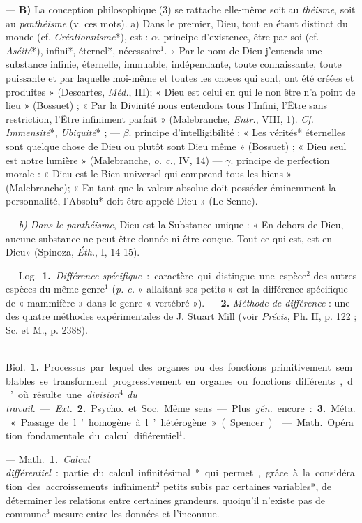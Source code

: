 \begin{itemize}[leftmargin=1cm, label=, itemsep=1pt]
— {\bf B)} La conception philosophique (3) se rattache elle-même
soit au {\it théisme}, soit au {\it panthéisme}
(v. ces mots). a) Dans le premier,
Dieu, tout en étant distinct du
monde (cf. {\it Créationnisme}*), est :
$\alpha$. principe d'existence, être par soi
(cf. {\it Aséité}*), infini*, éternel*, nécessaire$^1$. « Par le nom de Dieu j’entends une substance infinie, éternelle, immuable, indépendante,
toute connaissante, toute puissante
et par laquelle moi-même et toutes
les choses qui sont, ont été créées et
produites » (Descartes, {\it Méd.}, III);
« Dieu est celui en qui le non être
n’a point de lieu » (Bossuet) ; « Par
la Divinité nous entendons tous
l'Infini, l’Être sans restriction, l'Être
infiniment parfait » (Malebranche,
{\it Entr.}, VIII, 1). {\it Cf.} {\it Immensité}*,
{\it Ubiquité}* ; — $\beta$. principe d'intelligibilité : « Les vérités* éternelles
sont quelque chose de Dieu ou
plutôt sont Dieu même » (Bossuet) ;
« Dieu seul est notre lumière » (Malebranche, {\it o. c.}, IV, 14) — $\gamma$. principe
de perfection morale : « Dieu est le
Bien universel qui comprend tous
les biens » (Malebranche); « En tant
que la valeur absolue doit posséder
éminemment la personnalité, l’Absolu*
doit être appelé Dieu » (Le
Senne).

— {\it b) Dans le panthéisme}, Dieu
est la Substance unique : « En dehors
de Dieu, aucune substance ne peut
être donnée ni être conçue. Tout ce
qui est, est en Dieu» (Spinoza, {\it Éth.},
I, 14-15).

 — \si{Log.} {\bf 1.} {\it Différence spécifique} : caractère qui distingue une
espèce$^2$ des autres espèces du même
genre$^1$ ({\it p. e.} « allaitant ses petits » est
la différence spécifique de « mammifère » dans le genre « vertébré »).
— {\bf 2.} {\it Méthode de différence} : une
des quatre méthodes expérimentales
de J. Stuart Mill (voir  {\it Précis}, Ph. II,
p. 122 ; Sc. et M., p. 2388).

 — \si{Biol.} {\bf 1.} Processus par lequel des organes ou des
fonctions primitivement semblables
se transforment progressivement en
organes ou fonctions différents, d’où
résulte une {\it division$^4$ du travail.} —
{\it Ext.} {\bf 2.} \si{Psycho.} et \si{Soc.} Même sens.
— Plus  {\it gén.} encore : {\bf 3.} \si{Méta.} « Passage de l’homogène à l’hétérogène »
(Spencer).

 — \si{Math.} Opération
fondamentale du calcul difiérentiel$^1$.

 — \si{Math.} {\bf 1.} {\it Calcul différentiel} : partie du calcul infinitésimal* qui permet, grâce à la considération des accroissements infiniment$^2$ petits subis par certaines
variables*, de déterminer les relations entre certaines grandeurs,
quoiqu'il n'existe pas de commune$^3$
mesure entre les données et l’inconnue.


\end{itemize}
